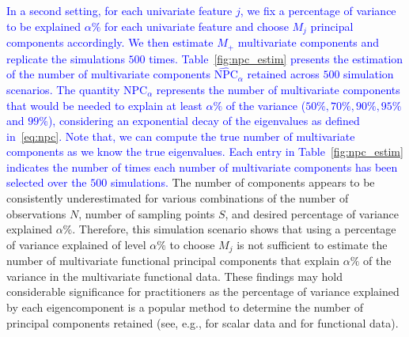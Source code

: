\textcolor{blue}{In a second setting, for each univariate feature $j$, we fix a percentage of variance to be explained $\alpha\%$ for each univariate feature and choose $M_j$ principal components accordingly. We then estimate $M_+$ multivariate components and replicate the simulations $500$ times. Table~\ref{fig:npc_estim} presents the estimation of the number of multivariate components $\widehat{\text{NPC}}_{\alpha}$ retained across $500$ simulation scenarios. The quantity $\text{NPC}_{\alpha}$ represents the number of multivariate components that would be needed to explain at least $\alpha\%$ of the variance ($50\%, 70\%, 90\%, 95\%$ and $99\%$), considering an exponential decay of the eigenvalues as defined in~\eqref{eq:npc}. Note that, we can compute the true number of multivariate components as we know the true eigenvalues. Each entry in Table~\ref{fig:npc_estim} indicates the number of times each number of multivariate components has been selected over the $500$ simulations.} The number of components appears to be consistently underestimated for various combinations of the number of observations $N$, number of sampling points $S$, and desired percentage of variance explained $\alpha\%$. Therefore, this simulation scenario shows that using a percentage of variance explained of level $\alpha\%$ to choose $M_j$ is not sufficient to estimate the number of multivariate functional principal components that explain $\alpha\%$ of the variance in the multivariate functional data. These findings may hold considerable significance for practitioners as the percentage of variance explained by each eigencomponent is a popular method to determine the number of principal components retained (see, e.g., \cite{jamesIntroductionStatisticalLearning2021} for scalar data and \cite{horvathInferenceFunctionalData2012a} for functional data).
